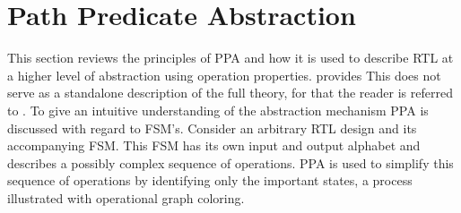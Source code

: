 \section{Path Predicate Abstraction}
\label{sec:ppa}

This section reviews the principles of PPA and how it is used to describe RTL at a higher level of abstraction using operation properties.  provides    This does not serve as a standalone description of the full theory, for that the reader is referred to \cite{2014-UrdahlStoffel.etal}. To give an intuitive understanding of the abstraction mechanism PPA is discussed with regard to FSM's. Consider an arbitrary RTL design and its accompanying FSM. This FSM has its own input and output alphabet and describes a possibly complex sequence of operations. PPA is used to simplify this sequence of operations by identifying only the important states, a process illustrated with operational graph coloring. \\ 

